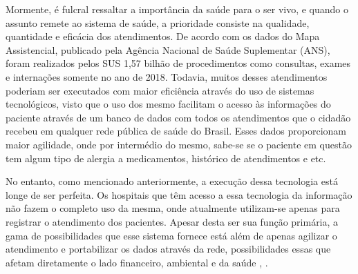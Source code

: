 \documentclass[twoside]{article}
\begin{document}
\begin{multicols}{2}
  Mormente, é fulcral ressaltar a importância da saúde para o ser vivo, e quando o assunto remete ao sistema de saúde, a prioridade consiste na qualidade, quantidade e eficácia dos atendimentos. De acordo com os dados do Mapa Assistencial, publicado pela Agência Nacional de Saúde Suplementar (ANS), foram realizados pelos SUS 1,57 bilhão de procedimentos como consultas, exames e internações somente no ano de 2018. Todavia, muitos desses atendimentos poderiam ser executados com maior eficiência através do uso de sistemas tecnológicos, visto que o uso dos mesmo facilitam o acesso às informações do paciente através de um banco de dados com todos os atendimentos que o cidadão recebeu em qualquer rede pública de saúde do Brasil. Esses dados proporcionam maior agilidade, onde por intermédio do mesmo, sabe-se se o paciente em questão tem algum tipo de alergia a medicamentos, histórico de atendimentos e etc.

  No entanto, como mencionado anteriormente, a execução dessa tecnologia está longe de ser perfeita. Os hospitais que têm acesso a essa tecnologia da informação não fazem o completo uso da mesma, onde atualmente utilizam-se apenas para registrar o atendimento dos pacientes. Apesar desta ser sua função primária, a gama de possibilidades que esse sistema fornece está além de apenas agilizar o atendimento e portabilizar os dados através da rede, possibilidades essas que afetam diretamente o lado financeiro, ambiental e da saúde \cite{Oliveira_2017}, \cite{Pinheiro_Filho_2012}.


\end{multicols}
\end{document}
